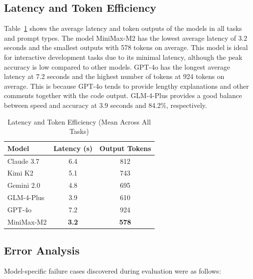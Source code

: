 \documentclass[conference]{IEEEtran}
\begin{document}
\subsection{Latency and Token Efficiency}

Table~\ref{tab:latency} shows the average latency and token outputs of the models in all tasks and prompt types. The model MiniMax-M2 has the lowest average latency of 3.2 seconds and the smallest outputs with 578 tokens on average. This model is ideal for interactive development tasks due to its minimal latency, although the peak accuracy is low compared to other models. GPT-4o has the longest average latency at 7.2 seconds and the highest number of tokens at 924 tokens on average. This is because GPT-4o tends to provide lengthy explanations and other comments together with the code output. GLM-4-Plus provides a good balance between speed and accuracy at 3.9 seconds and 84.2\%, respectively.

\begin{table}[H]
\centering
\caption{Latency and Token Efficiency (Mean Across All Tasks)}
\label{tab:latency}
\renewcommand{\arraystretch}{1.3}
\begin{tabular}{lcc}
\toprule
\textbf{Model} & \textbf{Latency (s)} & \textbf{Output Tokens} \\
\midrule
Claude 3.7  & 6.4 & 812 \\
Kimi K2     & 5.1 & 743 \\
Gemini 2.0  & 4.8 & 695 \\
GLM-4-Plus  & 3.9 & 610 \\
GPT-4o      & 7.2 & 924 \\
MiniMax-M2  & \textbf{3.2} & \textbf{578} \\
\bottomrule
\end{tabular}
\end{table}

\subsection{Error Analysis}

Model-specific failure cases discovered during evaluation were as follows:
\end{document}
